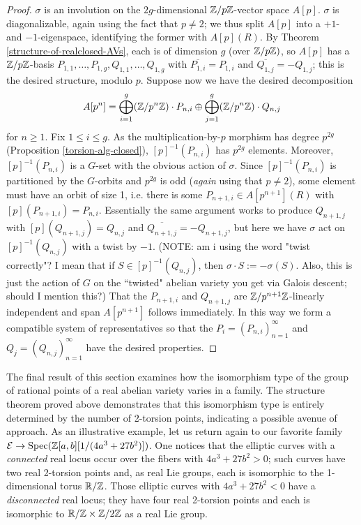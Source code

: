 \begin{proof}
$\sigma$ is an involution on the $2g$-dimensional $\mathbb{Z}/p\mathbb{Z}$-vector space $A[p]$. $\sigma$ is diagonalizable, again using the fact that $p\neq 2$; we thus split $A[p]$ into a $+1$- and $-1$-eigenspace, identifying the former with $A[p](R)$. By Theorem \ref{structure-of-realclosed-AVs}, each is of dimension $g$ (over $\mathbb{Z}/p\mathbb{Z})$, so $A[p]$ has a $\mathbb{Z}/p\mathbb{Z}$-basis $P_{1,1},\dots, P_{1,g},Q_{1,1},\dots, Q_{1,g}$ with $\overline{P_{1,i}}=P_{1,i}$ and $\overline{Q_{1,j}}=-Q_{1,j}$; this is the desired structure, modulo $p$. Suppose now we have the desired decomposition $$A[p^n]=\bigoplus_{i=1}^g(\mathbb{Z}/p^n\mathbb{Z})\cdot P_{n,i}\oplus \bigoplus_{j=1}^g(\mathbb{Z}/p^n\mathbb{Z})\cdot Q_{n,j}$$ for $n\geq 1$. Fix $1\leq i\leq g$. As the multiplication-by-$p$ morphism has degree $p^{2g}$ (Proposition \ref{torsion-alg-closed}), $[p]^{-1}(P_{n,i})$ has $p^{2g}$ elements. Moreover, $[p]^{-1}(P_{n,i})$ is a $G$-set with the obvious action of $\sigma$. Since $[p]^{-1}(P_{n,i})$ is partitioned by the $G$-orbits and $p^{2g}$ is odd (\emph{again} using that $p\neq 2$), some element must have an orbit of size 1, i.e. there is some $P_{n+1,i}\in A[p^{n+1}](R)$ with $[p](P_{n+1,i})=P_{n,i}$. Essentially the same argument works to produce $Q_{n+1,j}$ with $[p](Q_{n+1,j})=Q_{n,j}$ and $\overline{Q_{n+1,j}}=-Q_{n+1,j}$, but here we have $\sigma$ act on $[p]^{-1}(Q_{n,j})$ with a twist by $-1$. (NOTE: am i using the word "twist correctly"? I mean that if $S\in [p]^{-1}(Q_{n,j})$, then $\sigma\cdot S:=-\sigma(S)$. Also, this is just the action of $G$ on the ``twisted" abelian variety you get via Galois descent; should I mention this?) That the $P_{n+1,i}$ and $Q_{n+1,j}$ are $\mathbb{Z}/p^{n+1}\mathbb{Z}$-linearly independent and span $A[p^{n+1}]$ follows immediately. In this way we form a compatible system of representatives so that the $P_i=(P_{n,i})_{n=1}^{\infty}$ and $Q_j=(Q_{n,j})_{n=1}^{\infty}$ have the desired properties.
\end{proof}

The final result of this section examines how the isomorphism type of the group of rational points of a real abelian variety varies in a family. The structure theorem proved above demonstrates that this isomorphism type is entirely determined by the number of 2-torsion points, indicating a possible avenue of approach. As an illustrative example, let us return again to our favorite family $\mathcal{E}\rightarrow \operatorname{Spec}(\mathbb{Z}[a,b][1/(4a^3+27b^2)])$. One notices that the elliptic curves with a \emph{connected} real locus occur over the fibers with $4a^3+27b^2>0$; such curves have two real 2-torsion points and, as real Lie groups, each is isomorphic to the 1-dimensional torus $\mathbb{R}/\mathbb{Z}$. Those elliptic curves with $4a^3+27b^2<0$ have a \emph{disconnected} real locus; they have four real 2-torsion points and each is isomorphic to $\mathbb{R}/\mathbb{Z}\times\mathbb{Z}/2\mathbb{Z}$ as a real Lie group.

